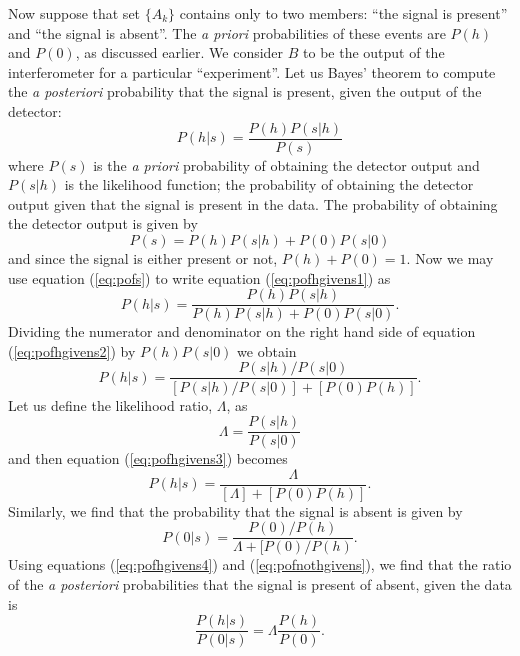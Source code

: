 Now suppose that set $\{A_k\}$ contains only to two members: ``the signal is
present'' and ``the signal is absent''. The \emph{a priori} probabilities of
these events are $P(h)$ and $P(0)$, as discussed earlier. We consider $B$ to
be the output of the interferometer for a particular ``experiment''. Let us
Bayes' theorem to compute the \emph{a posteriori} probability that the signal
is present, given the output of the detector:
\begin{equation}
P(h|s) = \frac{P(h)P(s|h)}{P(s)}
\label{eq:pofhgivens1}
\end{equation}
where $P(s)$ is the \emph{a priori} probability of obtaining the detector
output and $P(s|h)$ is the likelihood function; the probability of obtaining
the detector output given that the signal is present in the data. The
probability of obtaining the detector output is given by
\begin{equation}
P(s) = P(h)P(s|h) + P(0)P(s|0)
\label{eq:pofs}
\end{equation}
and since the signal is either present or not, $P(h) + P(0) = 1$. Now we may
use equation (\ref{eq:pofs}) to write equation (\ref{eq:pofhgivens1}) as
\begin{equation}
P(h|s) = \frac{P(h)P(s|h)}{P(h)P(s|h) + P(0)P(s|0)}.
\label{eq:pofhgivens2}
\end{equation}
Dividing the numerator and denominator on the right hand side of equation
(\ref{eq:pofhgivens2}) by $P(h)P(s|0)$ we obtain
\begin{equation}
P(h|s) = \frac{P(s|h)/P(s|0)}{[P(s|h)/P(s|0)] + [P(0)P(h)]}.
\label{eq:pofhgivens3}
\end{equation}
Let us define the likelihood ratio, $\Lambda$, as
\begin{equation}
\Lambda = \frac{P(s|h)}{P(s|0)}
\label{eq:likelihooddef}
\end{equation}
and then equation (\ref{eq:pofhgivens3}) becomes
\begin{equation}
P(h|s) = \frac{\Lambda}{[\Lambda] + [P(0)P(h)]}.
\label{eq:pofhgivens4}
\end{equation}
Similarly, we find that the probability that the signal is absent is given by
\begin{equation}
P(0|s) = \frac{P(0)/P(h)}{\Lambda + [P(0)/P(h)}.
\label{eq:pofnothgivens}
\end{equation}
Using equations (\ref{eq:pofhgivens4}) and (\ref{eq:pofnothgivens}), we find
that the ratio of the \emph{a posteriori} probabilities that the signal is
present of absent, given the data is
\begin{equation}
\frac{P(h|s)}{P(0|s)} = \Lambda\frac{P(h)}{P(0)}.
\label{eq:postratio}
\end{equation}

